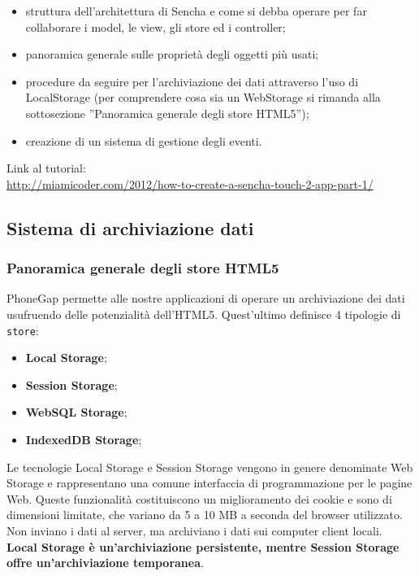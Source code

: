 \documentclass[10pt,a4paper,onecolumn]{article}
\begin{document}
\begin{itemize}
	\item struttura dell'architettura di Sencha e come si debba operare per far collaborare i model, le view, gli store ed i controller;
	\item panoramica generale sulle proprietà degli oggetti più usati;
	\item procedure da seguire per l'archiviazione dei dati attraverso l'uso di LocalStorage (per comprendere cosa sia un WebStorage si rimanda alla sottosezione ''Panoramica generale degli store HTML5'');
	\item creazione di un sistema di gestione degli eventi.
	
\end{itemize}
Link al tutorial:\\
\url{http://miamicoder.com/2012/how-to-create-a-sencha-touch-2-app-part-1/}\\

\subsection{Sistema di archiviazione dati}

\subsubsection{Panoramica generale degli store HTML5}
PhoneGap permette alle nostre applicazioni di operare un archiviazione dei dati usufruendo delle potenzialità dell'HTML5. Quest'ultimo definisce 4 tipologie di \texttt{store}:

\begin{itemize}
	\item \textbf{Local Storage};
	\item \textbf{Session Storage};
	\item \textbf{WebSQL Storage};
	\item \textbf{IndexedDB Storage};
\end{itemize}

Le tecnologie Local Storage e Session Storage vengono in genere denominate Web Storage e rappresentano una comune interfaccia di programmazione per le pagine Web. Queste funzionalità costituiscono un miglioramento dei cookie e sono di dimensioni limitate, che variano da 5 a 10 MB a seconda del browser utilizzato. Non inviano i dati al server, ma archiviano i dati sui computer client locali. \textbf{Local Storage è un'archiviazione persistente, mentre Session Storage offre un'archiviazione temporanea}.
\end{document}
